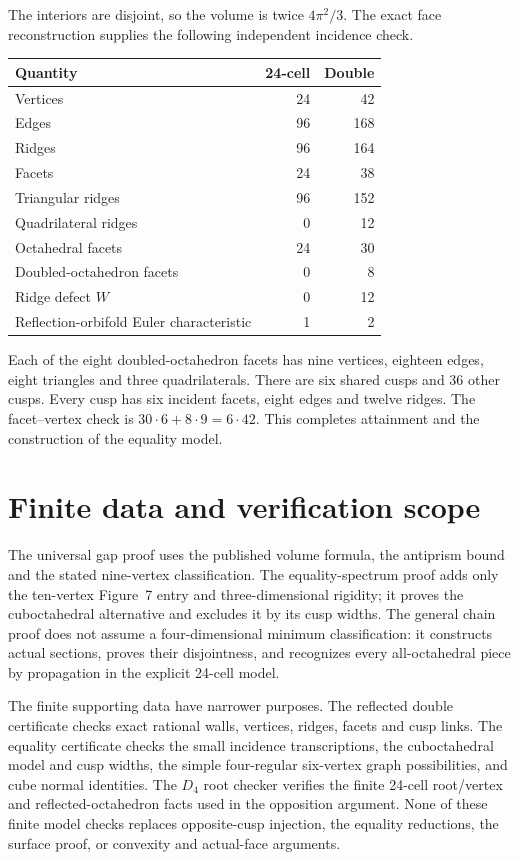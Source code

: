\documentclass[11pt]{article}
\theoremstyle{remark}
\begin{document}
The interiors are disjoint, so the volume is twice $4\pi^2/3$.
The exact face reconstruction supplies the following independent
incidence check.
\begin{center}
\begin{tabular}{lrr}
\toprule Quantity&24-cell&Double\\\midrule
Vertices&24&42\\ Edges&96&168\\ Ridges&96&164\\ Facets&24&38\\
Triangular ridges&96&152\\ Quadrilateral ridges&0&12\\
Octahedral facets&24&30\\ Doubled-octahedron facets&0&8\\
Ridge defect $W$&0&12\\ Reflection-orbifold Euler characteristic&1&2\\
\bottomrule
\end{tabular}
\end{center}
Each of the eight doubled-octahedron facets has nine vertices, eighteen
edges, eight triangles and three quadrilaterals. There are six shared
cusps and 36 other cusps. Every cusp has six incident facets, eight
edges and twelve ridges. The facet--vertex check is
$30\cdot6+8\cdot9=6\cdot42$. This completes attainment and
the construction of the equality model.

\appendix
\section{Finite data and verification scope}
The universal gap proof uses the published volume formula, the
antiprism bound and the stated nine-vertex classification. The
equality-spectrum proof adds only the ten-vertex Figure~7 entry and
three-dimensional rigidity; it proves the cuboctahedral alternative
and excludes it by its cusp widths. The general chain proof does
not assume a four-dimensional minimum classification: it constructs
actual sections, proves their disjointness, and recognizes every
all-octahedral piece by propagation in the explicit 24-cell model.

The finite supporting data have narrower purposes. The reflected
double certificate checks exact rational walls, vertices, ridges,
facets and cusp links. The equality certificate checks the small
incidence transcriptions, the cuboctahedral model and cusp widths,
the simple four-regular six-vertex graph possibilities, and cube
normal identities. The $D_4$ root checker verifies the finite
24-cell root/vertex and reflected-octahedron facts used in the
opposition argument. None of these finite model checks replaces
opposite-cusp injection, the equality reductions, the surface proof,
or convexity and actual-face arguments.
\end{document}
